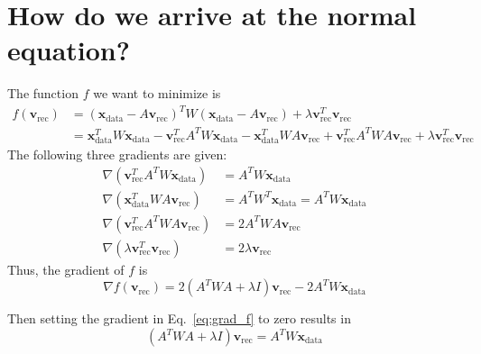 \documentclass[a4paper]{article}
\begin{document}
\section*{How do we arrive at the normal equation?}
The function $f$ we want to minimize is
\begin{align} \label{eq:f_1}
    f(\mathbf{v}_\mathrm{rec}) %
                               &= (\mathbf{x}_\mathrm{data}- A \mathbf{v}_\mathrm{rec})^T W (\mathbf{x}_\mathrm{data}- A \mathbf{v}_\mathrm{rec}) + \lambda \mathbf{v}_\mathrm{rec}^T \mathbf{v}_\mathrm{rec}\\
                               &=  \mathbf{x}_\mathrm{data}^T W \mathbf{x}_\mathrm{data} - \mathbf{v}_\mathrm{rec}^T A^T W \mathbf{x}_\mathrm{data} - \mathbf{x}_\mathrm{data}^T W A \mathbf{v}_\mathrm{rec} + \mathbf{v}_\mathrm{rec}^T A^T W A \mathbf{v}_\mathrm{rec} + \lambda \mathbf{v}_\mathrm{rec}^T \mathbf{v}_\mathrm{rec}
\end{align}
The following three gradients are given:
\begin{align}
    \nabla (\mathbf{v}_\mathrm{rec}^T A^T W \mathbf{x}_\mathrm{data})  &= A^T W \mathbf{x}_\mathrm{data}\\
    \nabla (\mathbf{x}_\mathrm{data}^T W A \mathbf{v}_\mathrm{rec})    &= A^T W^T \mathbf{x}_\mathrm{data} = A^T W \mathbf{x}_\mathrm{data}\\
    \nabla (\mathbf{v}_\mathrm{rec}^T A^T W A \mathbf{v}_\mathrm{rec}) &= 2 A^T W A \mathbf{v}_\mathrm{rec}\\
    \nabla (\lambda \mathbf{v}_\mathrm{rec}^T \mathbf{v}_\mathrm{rec}) &= 2 \lambda \mathbf{v}_\mathrm{rec}
\end{align}
Thus, the gradient of $f$ is
\begin{equation}\label{eq:grad_f}
    \nabla f(\mathbf{v}_\mathrm{rec})= 2 (A^T W A + \lambda I) \mathbf{v}_\mathrm{rec} - 2 A^T W \mathbf{x}_\mathrm{data}
\end{equation}

Then setting the gradient in Eq.~\eqref{eq:grad_f} to zero results in
\begin{equation}
    (A^T W A + \lambda I) \mathbf{v}_\mathrm{rec} = A^T W \mathbf{x}_\mathrm{data}
\end{equation}
\end{document}
